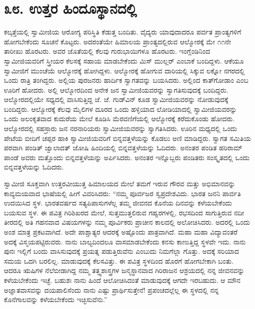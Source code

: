 
\chapter*{೩೮. ಉತ್ತರ ಹಿಂದೂಸ್ಥಾನದಲ್ಲಿ}

 ಕಲ್ಕತ್ತೆಯಲ್ಲಿ ಸ್ವಾಮೀಜಿಯ ಆರೋಗ್ಯ ಪರಿಸ್ಥಿತಿ ಕೆಡುತ್ತ ಬಂದಿತು. ವೈದ್ಯರು ಯಾವುದಾದರೂ ಪರ್ವತ ಪ್ರಾಂತ್ಯಗಳಿಗೆ ಹೋಗಬೇಕೆಂದು ಸೂಚನೆ ಕೊಟ್ಟರು. ಅದರಂತೆಯೇ ಹಿಮಾಲಯ ಪ್ರಾಂತ್ಯದಲ್ಲಿರುವ ಆಲ್ಮೋರಕ್ಕೆ ಮೇ ೧೧ನೇ ತಾರೀಖು ಹೊರಟರು. ಅವರ ಜೊತೆಯಲ್ಲಿ ಕೆಲವು ಗುರುಭಾಯಿಗಳೂ ಹೊರಟರು. ಇಂಗ್ಲೆಂಡಿನಿಂದ ಸ್ವಾಮೀಜಿಯವರಿಗೆ ಸ್ತ್ರೀಯರ ಕೆಲಸಕ್ಕೆ ಸಹಾಯ ಮಾಡಬೇಕೆಂದು ಮಿಸ್ ಮುಲ್ಲರ್ ಎಂಬಾಕೆ ಬಂದಿದ್ದಳು. ಆಕೆಯೂ ಸ್ವಾಮೀಜಿಗೆ ಮುಂಚೆಯೆ ಆಲ್ಮೋರಕ್ಕೆ ಹೋಗಿದ್ದಳು. ಆಲ್ಮೋರಕ್ಕೆ ಹೋಗುವ ದಾರಿಯಲ್ಲಿ ಸಿಕ್ಕುವ ಲಕ್ನೋ ನಗರದಲ್ಲಿ ಒಂದು ರಾತ್ರಿ ತಂಗಿದ್ದರು. ಅಲ್ಲಿಯ ಪುರಜನರು ಹಾರ್ದಿಕ ಸ್ವಾಗತವನ್ನು ಬಯಸಿದರು. ಅಲ್ಲಿಂದ ಕಾತ್‍ಗೋಡಾಂ ಎಂಬ ಊರಿಗೆ ಹೋದರು. ಅಲ್ಲಿ ಆಲ್ಮೋರದಿಂದ ಅನೇಕ ಜನ ಸ್ವಾಮೀಜಿಯವರನ್ನು ಸ್ವಾಗತಿಸುವುದಕ್ಕೆ ಬಂದಿದ್ದರು. ಆಲ್ಮೋರದಲ್ಲಿಯೇ ಸಧ್ಯದಲ್ಲಿ ವಾಸಿಸುತ್ತಿದ್ದ ಜೆ. ಜೆ. ಗುಡ್‍ವಿನ್ ಕೂಡ ಸ್ವಾಮೀಜಿಯವರನ್ನು ನೋಡುವುದಕ್ಕೆ ಬಂದಿದ್ದರು. ಆಲ್ಮೋರಕ್ಕೆ ಕೆಲವು ಮೈಲಿಗಳ ದೂರದ ಒಂದು ಹಳ್ಳಿಯಾದ ಲೋಡಿಯಾದಲ್ಲಿ ಸ್ವಾಮೀಜಿಯವರನ್ನು ಒಂದು ಅಲಂಕೃತವಾದ ಕುದುರೆಯ ಮೇಲೆ ಕೂಡಿಸಿ ಮೆರವಣಿಗೆಯಲ್ಲಿ ಆಲ್ಮೋರಕ್ಕೆ ಕರೆದುಕೊಂಡು ಹೋದರು. ಆಲ್ಮೋರದಲ್ಲಿ ಸಹಸ್ರಾರು ಜನ ನರನಾರಿಯರು ಸ್ವಾಮೀಜಿಯವರನ್ನು ಸ್ವಾಗತಿಸಿದರು. ಊರಿನ ಮಧ್ಯದಲ್ಲಿ ಒಂದು ಪೇಟೆಯ ಬೀದಿಗೆ ಚಪ್ಪರ ಹಾಕಿ ಸ್ವಾಮೀಜಿಯವರಿಗೆ ಬಿನ್ನವತ್ತಳೆಯನ್ನು ಕೊಡಲು ಅಣಿ ಮಾಡಿದ್ದರು. ಸ್ವಾಗತ ಸಮಿತಿಯ ಪರವಾಗಿ ಪಂಡಿತ್ ಜ್ವಾಲಾದತ್ ಜೋಷಿ ಹಿಂದಿಯಲ್ಲಿ ಬಿನ್ನವತ್ತಳೆಯನ್ನು ಓದಿದರು. ಅನಂತರ ಪಂಡಿತ ಹರಿರಾಮ್ ಪಾಂಡೆ ಅವರು ಮತ್ತೊಂದು ಬಿನ್ನವತ್ತಳೆಯನ್ನು ಅರ್ಪಿಸಿದರು. ಅನಂತರ ಇನ್ನೊಬ್ಬರು ಪಂಡಿತರು ಸಂಸ್ಕೃತದಲ್ಲಿ ಒಂದು ಬಿನ್ನವತ್ತಳೆಯನ್ನು ಓದಿದರು. 

 ಸ್ವಾಮೀಜಿ ಸೂಕ್ತವಾಗಿ ಉತ್ತರವೀಯುತ್ತ ಹಿಮಾಲಯದ ಮೇಲೆ ತಮಗೆ ಇರುವ ಗೌರವ ಮತ್ತು ಅಭಿಮಾನವನ್ನು ಕಾವ್ಯಮಯವಾದ ಭಾಷೆಯಲ್ಲಿ ಹೀಗೆ ವಿವರಿಸಿದರು: “ನಮ್ಮ ಪೂರ್ವಜರ ಸ್ವಪ್ರದೇಶವಿದು. ಭಾರತ ಜನನಿ ಪಾರ್ವತಿ ಉದಯಿಸಿದ ಸ್ಥಳ. ಭಾರತವರ್ಷದ ಸತ್ಯಪಿಪಾಸುಗಳೆಲ್ಲ ತಮ್ಮ ಜೀವನದ ಕೊನೆಯ ದಿನವನ್ನು ಕಳೆಯಬೇಕೆಂದು ಬಯಸುವ ಸ್ಥಳ. ಈ ಪವಿತ್ರ ಗಿರಿಶಿಖರದ ಮೇಲೆ, ಸುತ್ತಮುತ್ತಲಿರುವ ಗಹ್ವರಗಳಲ್ಲಿ, ರಭಸದಿಂದ ಸಾಗುತ್ತಿರುವ ನದೀ ತೀರದಲ್ಲಿ ಅತಿ ಗಹನವಾದ ವಿಷಯಗಳನ್ನು ನಮ್ಮ ಪೂರ್ವಿಕರು ಪ್ರಾಚೀನ ಕಾಲದಲ್ಲಿ ಅಲೋಚಿಸಿದರು. ಅದರಲ್ಲಿ ಒಂದು ಅಂಶ ಮಾತ್ರ ಪ್ರಕಟವಾಗಿದೆ. ಅದೇ ಪಾಶ್ಚಾತ್ಯರ ಆದರಕ್ಕೆ ಅಷ್ಟೊಂದು ಪಾತ್ರವಾಗಿದೆ. ಮಹಾ ಮಹಾ ವಿದ್ಯಾವಂತರೆ ಅದಕ್ಕೆ ವಿಸ್ಮಯಪಟ್ಟಿರುವರು. ನಾನು ಬಾಲ್ಯದಿಂದಲೂ ವಾಸಮಾಡಬೇಕೆಂದು ಕನಸು ಕಾಣುತ್ತಿದ್ದ ಸ್ಥಳವೇ ಇದು. ನಾನು ಪುನಃ ಇಲ್ಲಿಗೆ ಬಂದು ವಾಸಿಸುವುದಕ್ಕೆ ಪ್ರಯತ್ನ ಪಡುತ್ತಿರುವೆನು ಎಂಬುದು ನಿಮಗೆಲ್ಲಾ ಗೊತ್ತು. ಅದಕ್ಕೆ ಸರಿಯಾದ ಸಮಯ ಒದಗಿ ಬರಲಿಲ್ಲ. ಮಾಡುವುದಕ್ಕೆ ಕೆಲಸವಿತ್ತು. ಈ ಪವಿತ್ರ ಸ್ಥಳದಿಂದ ಹೊರಗೆ ಹೋಗಬೇಕಾಗಿ ಬಂತು. ಆದರೂ ಋಷಿಗಳ ನೆಲೆಬೀಡಾಗಿದ್ದ ನಮ್ಮ ತತ್ತ್ವಶಾಸ್ತ್ರಗಳ ಜನ್ಮಸ್ಥಾನವಾದ ಗಿರಿರಾಜನ ಆಶ್ರಯದಲ್ಲಿ ನನ್ನ ಜೀವನವನ್ನು ಕಳೆಯಬೇಕೆಂದು ಇಚ್ಛೆ. ಬಹುಶಃ ನಾನು ಹಿಂದೆ ಆಲೋಚಿಸಿದಂತೆ ಮಾಡುವುದಕ್ಕೆ ಆಗದೇ ಇರಬಹುದು. ಆ ಮೌನ ಅಜ್ಞಾತವಾಸವನ್ನು ದಯಪಾಲಿಸೆಂದು ನಾನು ಎಷ್ಟು ಪ್ರಾರ್ಥಿಸುತ್ತೇನೆ! ಪ್ರಪಂಚದಲ್ಲೆಲ್ಲ ಈ ಸ್ಥಳದಲ್ಲಿ ನನ್ನ ಕೊನೆಗಾಲವನ್ನು ಕಳೆಯಬೇಕೆಂದು ಇಚ್ಛಿಸುವೆನು.” 

